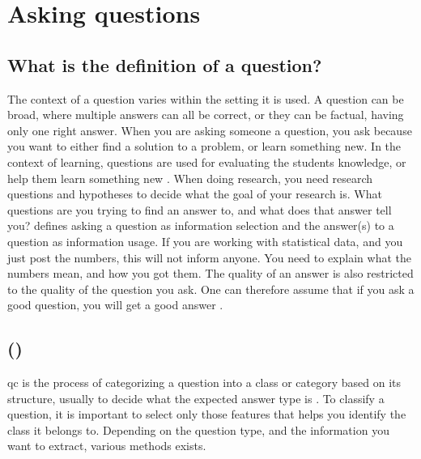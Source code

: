 \section{Asking questions}
\label{sec:asking_questions}

\subsection{What is the definition of a question?}
\label{sec:question_definition}
The context of a question varies within the setting it is used. 
A question can be broad, where multiple answers can all be correct, or they can be factual, having only one right answer. 
When you are asking someone a question, you ask because you want to either find a solution to a problem, or learn something new. 
In the context of learning, questions are used for evaluating the students knowledge, or help them learn something new \textcite{Nielsen2008}.
\vspace{0.5em}\newline
When doing research, you need research questions and hypotheses to decide what the goal of your research is. 
What questions are you trying to find an answer to, and what does that answer tell you?
\textcite{Slowiaczek1992} defines asking a question as information selection and the answer(s) to a question as information usage. 
If you are working with statistical data, and you just post the numbers, this will not inform anyone. 
You need to explain what the numbers mean, and how you got them.
The quality of an answer is also restricted to the quality of the question you ask. 
One can therefore assume that if you ask a good question, you will get a good answer \cite{Slowiaczek1992}. 

\subsection[Question classification]{ ()}
\label{sec:question_classification}
\gls{qc} is the process of categorizing a question into a class or category based on its structure, usually to decide what the expected answer type is \cite{Li, Loni2011, Lopez2011}. 
To classify a question, it is important to select only those features that helps you identify the class it belongs to.
Depending on the question type, and the information you want to extract, various methods exists.


